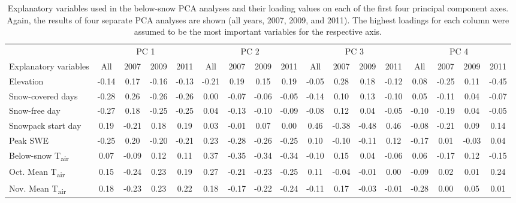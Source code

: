 
\begin{sidewaystable}
    \centering
    \caption{Explanatory variables used in the below-snow PCA analyses and their loading values on each of the first four principal component axes. Again, the results of four separate PCA analyses are shown (all years, 2007, 2009, and 2011). The highest loadings for each column were assumed to be the most important variables for the respective axis.\label{winter_pcloadings_t}}
    \begin{threeparttable}
        \begin{tabular}{lcccccccccccccccc}
            \toprule
            {} & \multicolumn{4}{c}{PC 1}& \multicolumn{4}{c}{PC 2}& \multicolumn{4}{c}{PC 3}& \multicolumn{4}{c}{PC 4}\\
            \cmidrule(l){2-5} \cmidrule(l){6-9} \cmidrule(l){10-13} \cmidrule(l){14-17}
            Explanatory variables &All	&2007 &2009 &2011 &All &2007 &2009 &2011 &All &2007 &2009 &2011& All &2007 &2009 &2011\\
            \midrule
            Elevation	&-0.14	&0.17	&-0.16	&-0.13	&-0.21	&0.19	&0.15	&0.19	&-0.05	&0.28	&0.18	&-0.12	&0.08	&-0.25	&0.11	&-0.45\\
            Snow-covered days\tnote{a}	&-0.28	&0.26	&-0.26	&-0.26	&0.00	&-0.07	&-0.06	&-0.05	&-0.14	&0.10	&0.13	&-0.10	&0.05	&-0.11	&0.04	&-0.07\\
            Snow-free day	&-0.27	&0.18	&-0.25	&-0.25	&0.04	&-0.13	&-0.10	&-0.09	&-0.08	&0.12	&0.04	&-0.05	&-0.10	&-0.19	&0.04	&-0.05\\
            Snowpack start day	&0.19	&-0.21	&0.18	&0.19	&0.03	&-0.01	&0.07	&0.00	&0.46	&-0.38	&-0.48	&0.46	&-0.08	&-0.21	&0.09	&0.14\\
            Peak SWE	&-0.25	&0.20	&-0.20	&-0.21	&0.23	&-0.28	&-0.26	&-0.25	&0.10	&-0.10	&-0.11	&0.12	&-0.17	&0.01	&-0.03	&0.04\\
            Below-snow T\textsubscript{air}\tnote{b}	&0.07	&-0.09	&0.12	&0.11	&0.37	&-0.35	&-0.34	&-0.34	&-0.10	&0.15	&0.04	&-0.06	&0.06	&-0.17	&0.12	&-0.15\\
            Oct. Mean T\textsubscript{air}	&0.15	&-0.24	&0.23	&0.19	&0.27	&-0.21	&-0.23	&-0.25	&0.11	&-0.04	&-0.01	&0.00	&-0.09	&0.02	&0.01	&0.24\\
            Nov. Mean T\textsubscript{air}	&0.18	&-0.23	&0.23	&0.22	&0.18	&-0.17	&-0.22	&-0.24	&-0.11	&0.17	&-0.03	&-0.01	&-0.28	&0.00	&0.05	&0.01\\

\end{tabular}
\end{threeparttable}
\end{sidewaystable}
